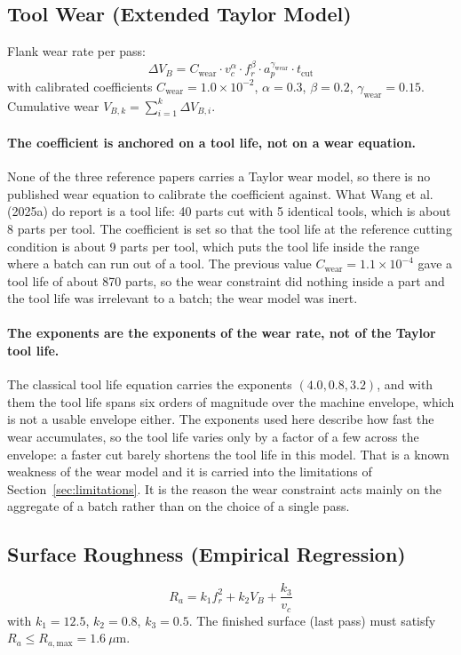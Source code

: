 \documentclass[11pt,a4paper]{article}
\newcommand{\Ra}{R_a}
\newcommand{\RaMax}{R_{a,\text{max}}}
\newcommand{\VB}{V_B}
\begin{document}
\subsection{Tool Wear (Extended Taylor Model)}
\label{sec:wear}
Flank wear rate per pass:
\begin{equation}
    \Delta \VB = C_\text{wear} \cdot v_c^{\alpha} \cdot f_r^{\beta} \cdot a_p^{\gamma_\text{wear}} \cdot t_\text{cut}
    \label{eq:wear}
\end{equation}
with calibrated coefficients $C_\text{wear}=1.0\times10^{-2}$, $\alpha=0.3$, $\beta=0.2$, $\gamma_\text{wear}=0.15$. Cumulative wear $V_{B,k} = \sum_{i=1}^k \Delta V_{B,i}$.

\paragraph{The coefficient is anchored on a tool life, not on a wear equation.}
None of the three reference papers carries a Taylor wear model, so there is no published wear equation to calibrate the coefficient against. What Wang et al. (2025a) do report is a tool life: 40 parts cut with 5 identical tools, which is about 8 parts per tool. The coefficient is set so that the tool life at the reference cutting condition is about 9 parts per tool, which puts the tool life inside the range where a batch can run out of a tool. The previous value $C_\text{wear}=1.1\times10^{-4}$ gave a tool life of about 870 parts, so the wear constraint did nothing inside a part and the tool life was irrelevant to a batch; the wear model was inert.

\paragraph{The exponents are the exponents of the wear rate, not of the Taylor tool life.}
The classical tool life equation carries the exponents $(4.0, 0.8, 3.2)$, and with them the tool life spans six orders of magnitude over the machine envelope, which is not a usable envelope either. The exponents used here describe how fast the wear accumulates, so the tool life varies only by a factor of a few across the envelope: a faster cut barely shortens the tool life in this model. That is a known weakness of the wear model and it is carried into the limitations of Section~\ref{sec:limitations}. It is the reason the wear constraint acts mainly on the aggregate of a batch rather than on the choice of a single pass.

\subsection{Surface Roughness (Empirical Regression)}
\label{sec:roughness}
\begin{equation}
    \Ra = k_1 f_r^2 + k_2 \VB + \frac{k_3}{v_c}
    \label{eq:roughness}
\end{equation}
with $k_1=12.5$, $k_2=0.8$, $k_3=0.5$. The finished surface (last pass) must satisfy $\Ra \le \RaMax = 1.6\ \mu\text{m}$.
\end{document}
